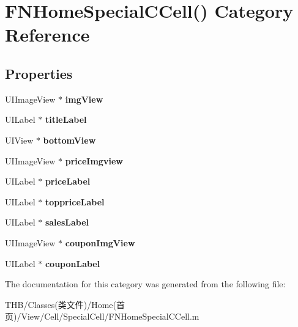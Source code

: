\hypertarget{category_f_n_home_special_c_cell_07_08}{}\section{F\+N\+Home\+Special\+C\+Cell() Category Reference}
\label{category_f_n_home_special_c_cell_07_08}
\subsection*{Properties}
\begin{DoxyCompactItemize}
\item 
\mbox{\label{category_f_n_home_special_c_cell_07_08_a330ec69dd61043747a2a05662a55b8cd}} 
U\+I\+Image\+View $\ast$ {\bfseries img\+View}
\item 
\mbox{\label{category_f_n_home_special_c_cell_07_08_a974b8c3442841620e621da1460ac985c}} 
U\+I\+Label $\ast$ {\bfseries title\+Label}
\item 
\mbox{\label{category_f_n_home_special_c_cell_07_08_af874aa9a5fef56fabb244962d1812d91}} 
U\+I\+View $\ast$ {\bfseries bottom\+View}
\item 
\mbox{\label{category_f_n_home_special_c_cell_07_08_afe4bf5c7367eaa67c407df2a5eeaec97}} 
U\+I\+Image\+View $\ast$ {\bfseries price\+Imgview}
\item 
\mbox{\label{category_f_n_home_special_c_cell_07_08_a49d15be5f94c991d06573296099db299}} 
U\+I\+Label $\ast$ {\bfseries price\+Label}
\item 
\mbox{\label{category_f_n_home_special_c_cell_07_08_a88c9364549a0c394796ab1c81806e362}} 
U\+I\+Label $\ast$ {\bfseries topprice\+Label}
\item 
\mbox{\label{category_f_n_home_special_c_cell_07_08_aa78f2279d4e1dbb2788d52f5bb5694d2}} 
U\+I\+Label $\ast$ {\bfseries sales\+Label}
\item 
\mbox{\label{category_f_n_home_special_c_cell_07_08_a3e55c3ebdbc0568fa27d6c410dcce9b9}} 
U\+I\+Image\+View $\ast$ {\bfseries coupon\+Img\+View}
\item 
\mbox{\label{category_f_n_home_special_c_cell_07_08_aea21447c88df386b2a55250e53729f09}} 
U\+I\+Label $\ast$ {\bfseries coupon\+Label}
\end{DoxyCompactItemize}


The documentation for this category was generated from the following file\+:\begin{DoxyCompactItemize}
\item 
T\+H\+B/\+Classes(类文件)/\+Home(首页)/\+View/\+Cell/\+Special\+Cell/F\+N\+Home\+Special\+C\+Cell.\+m\end{DoxyCompactItemize}
